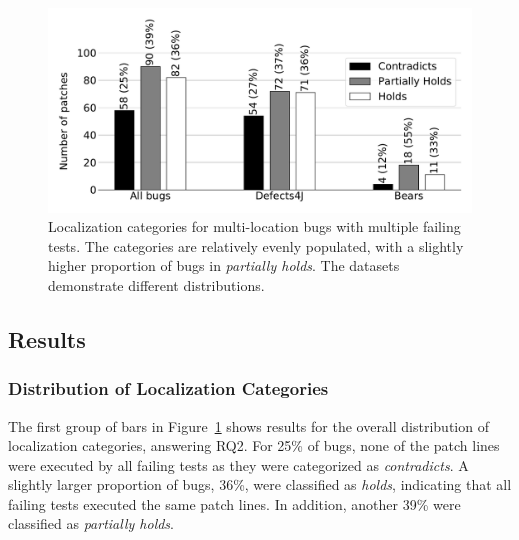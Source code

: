 \documentclass[10pt,journal,compsoc]{IEEEtran}
\begin{document}
\begin{figure}
  \includegraphics[width=\linewidth]{img/coverage_hist_all.pdf}
  \caption{\small Localization categories for multi-location bugs with multiple failing
      tests. The categories are relatively 
      evenly populated, with a slightly higher proportion of bugs in
      \emph{partially holds}. The datasets demonstrate different distributions.}
  \label{fig:coverage-all}
\end{figure}

\subsection{Results}
 \label{sec:cov_patterns}

\subsubsection{Distribution of Localization Categories}
The first group of bars in Figure~\ref{fig:coverage-all} shows results for the overall distribution 
of localization categories, 
answering RQ2. 
For 25\% of bugs, none of the patch lines were executed by all failing tests as they were 
categorized as \emph{contradicts}.  A slightly larger proportion of bugs, 36\%, were classified 
as 
\emph{holds}, indicating that all failing tests executed the same patch lines.
In addition, another 39\% were classified as \emph{partially holds}.
\end{document}
